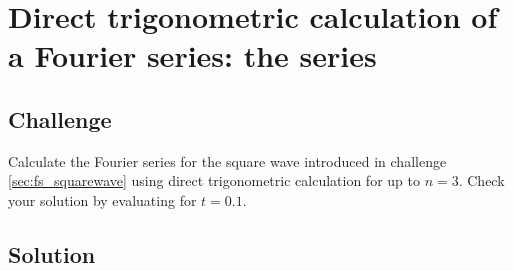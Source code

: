 \newpage
\section{Direct trigonometric calculation of a Fourier series: the series}

\subsection*{Challenge}
Calculate the Fourier series for the square wave introduced in challenge \ref{sec:fs_squarewave} using direct trigonometric calculation for up to $n=3$. Check your solution by evaluating for $t=0.1$.

\subsection*{Solution}
\six{}





